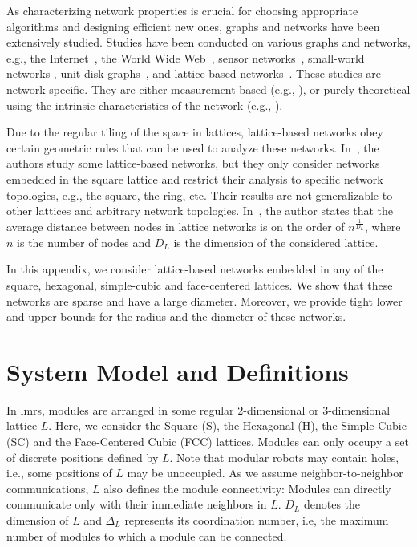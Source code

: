 As characterizing network properties is crucial for choosing appropriate algorithms and designing efficient new ones, graphs and networks have been extensively studied. Studies have been conducted on various graphs and networks, e.g., the Internet~\cite{latapy2006measuring,cardozoend,jin2006small}, the World Wide Web~\cite{albert1999internet}, sensor networks~\cite{jennings2002diameter}, small-world networks \cite{watts1998collective,hayes2000graph}, unit disk graphs~\cite{ellis2004random}, and lattice-based networks~\cite{hayes2000graph,barrenetxea2006lattice,barthelemy2011spatial}. These studies are network-specific. They are either measurement-based (e.g.,  \cite{latapy2006measuring,cardozoend,albert1999internet}), or purely theoretical using the intrinsic characteristics of the network (e.g., \cite{jennings2002diameter,ellis2004random,barrenetxea2006lattice,barthelemy2011spatial}).

Due to the regular tiling of the space in lattices, lattice-based networks obey certain geometric rules that can be used to analyze these networks. In~\cite{hayes2000graph, barrenetxea2006lattice}, the authors study some lattice-based networks, but they only consider networks embedded in the square lattice and restrict their analysis to specific network topologies, e.g., the square, the ring, etc. Their results are not generalizable to other lattices and arbitrary network topologies. In~\cite{barthelemy2011spatial}, the author states that the average distance between nodes in lattice networks is on the order of ${n}^{\frac{1}{D_L}}$, where $n$ is the number of nodes and $D_L$ is the dimension of the considered lattice.

In this appendix, we consider lattice-based networks embedded in any of the square, hexagonal, simple-cubic and face-centered lattices. We show that these networks are sparse and have a large diameter. Moreover, we provide tight lower and upper bounds for the radius and the diameter of these networks.

\section{System Model and Definitions}
\label{section:appendixLMRs:model}

In \gls{lmrs}, modules are arranged in some regular 2-dimensional or 3-dimensional lattice $L$. Here, we consider the Square (S), the Hexagonal (H), the Simple Cubic (SC) and the Face-Centered Cubic (FCC) lattices. Modules can only occupy a set of discrete positions defined by $L$. Note that modular robots may contain holes, i.e., some positions of $L$ may be unoccupied. As we assume neighbor-to-neighbor communications, $L$ also defines the module connectivity: Modules can directly communicate only with their immediate neighbors in $L$. $D_L$ denotes the dimension of $L$ and $\Delta_L$ represents its coordination number, i.e, the maximum number of modules to which a module can be connected.

